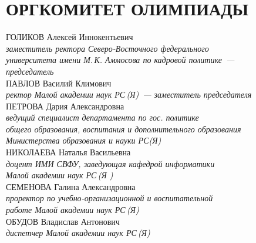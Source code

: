 \section[Оргкомитет]{ОРГКОМИТЕТ ОЛИМПИАДЫ}
\thispagestyle{plain}

ГОЛИКОВ Алексей Иннокентьевич \\ 
\textit{заместитель ректора Северо-Восточного федерального \\
университета имени М.\,К. Аммосова по кадровой политике~--- \\
председатель}
\\[3mm]
ПАВЛОВ Василий Климович \\
\textit{ректор Малой академии наук РС\,(Я)~--- заместитель председателя}
\\[3mm]
ПЕТРОВА Дария Александровна \\
\textit{ведущий специалист департамента по гос. политике \\
общего образования, воспитания и дополнительного образования \\
Министерства образования и науки РС(Я)}
\\[3mm]
НИКОЛАЕВА Наталья Васильевна \\
\textit{доцент ИМИ СВФУ, заведующая кафедрой информатики \\
Малой академии наук РС\,(Я  )}
\\[3mm]
СЕМЕНОВА Галина Александровна \\
\textit{проректор по учебно-организационной и воспитательной \\ 
работе Малой академии наук РС\,(Я)} 
\\[3mm]
ОБУДОВ Владислав Антонович \\
\textit{диспетчер  Малой академии наук РС\,(Я)}
\\[3mm]
